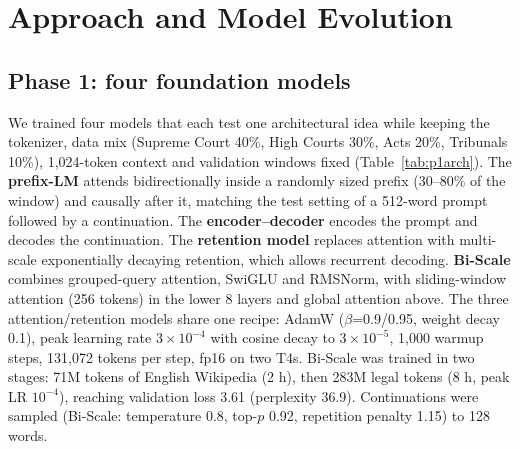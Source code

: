 \documentclass[11pt]{article}
\begin{document}
\section{Approach and Model Evolution}
\label{sec:approach}

\subsection{Phase 1: four foundation models}
We trained four models that each test one architectural idea while keeping the tokenizer, data mix (Supreme Court 40\%, High Courts 30\%, Acts 20\%, Tribunals 10\%), 1{,}024-token context and validation windows fixed (Table~\ref{tab:p1arch}). The \textbf{prefix-LM} attends bidirectionally inside a randomly sized prefix (30--80\% of the window) and causally after it, matching the test setting of a 512-word prompt followed by a continuation. The \textbf{encoder--decoder} encodes the prompt and decodes the continuation. The \textbf{retention model} replaces attention with multi-scale exponentially decaying retention, which allows recurrent decoding. \textbf{Bi-Scale} combines grouped-query attention, SwiGLU and RMSNorm, with sliding-window attention (256 tokens) in the lower 8 layers and global attention above. The three attention/retention models share one recipe: AdamW ($\beta$=0.9/0.95, weight decay 0.1), peak learning rate $3\times10^{-4}$ with cosine decay to $3\times10^{-5}$, 1{,}000 warmup steps, 131{,}072 tokens per step, fp16 on two T4s. Bi-Scale was trained in two stages: 71M tokens of English Wikipedia (2 h), then 283M legal tokens (8 h, peak LR $10^{-4}$), reaching validation loss 3.61 (perplexity 36.9). Continuations were sampled (Bi-Scale: temperature 0.8, top-$p$ 0.92, repetition penalty 1.15) to 128 words.

\begin{table}[H]
\centering\small
\caption{Phase-1 models (parameter counts as loaded from the final checkpoints).}
\label{tab:p1arch}
\end{table}
\end{document}
